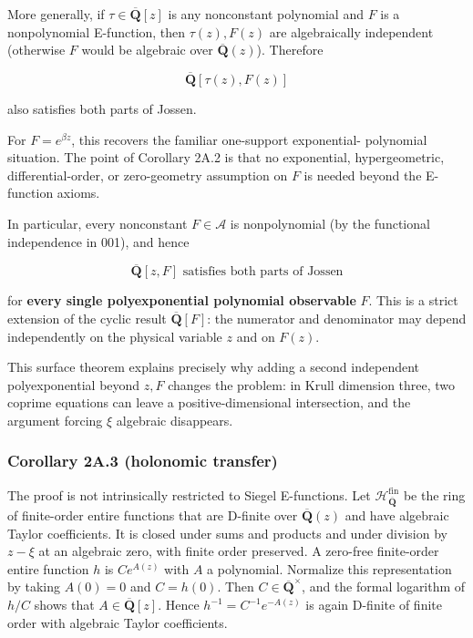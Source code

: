 More generally, if \(\tau\in\overline{\mathbf Q}[z]\) is any nonconstant
polynomial and \(F\) is a nonpolynomial E-function, then \(\tau(z),F(z)\)
are algebraically independent (otherwise \(F\) would be algebraic over
\(\overline{\mathbf Q}(z)\)). Therefore

\[
  \overline{\mathbf Q}[\tau(z),F(z)]
\]

also satisfies both parts of Jossen.

For \(F=e^{\beta z}\), this recovers the familiar one-support exponential-
polynomial situation. The point of Corollary 2A.2 is that no exponential,
hypergeometric, differential-order, or zero-geometry assumption on \(F\) is
needed beyond the E-function axioms.

In particular, every nonconstant \(F\in\mathscr A\) is nonpolynomial (by the
functional independence in 001), and hence

\[
  \boxed{\overline{\mathbf Q}[z,F]\text{ satisfies both parts of Jossen}}
                                                                  \tag{J-2A.4}
\]

for \textbf{every single polyexponential polynomial observable} \(F\). This is a
strict extension of the cyclic result
\(\overline{\mathbf Q}[F]\): the numerator and denominator may depend
independently on the physical variable \(z\) and on \(F(z)\).

This surface theorem explains precisely why adding a second independent
polyexponential beyond \(z,F\) changes the problem: in Krull dimension three,
two coprime equations can leave a positive-dimensional intersection, and the
argument forcing \(\xi\) algebraic disappears.

\subsubsection{Corollary 2A.3 (holonomic transfer)}

The proof is not intrinsically restricted to Siegel E-functions. Let
\(\mathcal H_{\overline{\mathbf Q}}^{\mathrm{fin}}\) be the ring of
finite-order entire functions that are D-finite over
\(\overline{\mathbf Q}(z)\) and have algebraic Taylor coefficients. It is
closed under sums and products and under division by \(z-\xi\) at an
algebraic zero, with finite order preserved. A zero-free finite-order entire
function \(h\) is \(Ce^{A(z)}\) with \(A\) a polynomial. Normalize this
representation by taking \(A(0)=0\) and \(C=h(0)\). Then
\(C\in\overline{\mathbf Q}^{\times}\), and the formal logarithm of \(h/C\)
shows that \(A\in\overline{\mathbf Q}[z]\). Hence \(h^{-1}=C^{-1}e^{-A(z)}\)
is again D-finite of finite order with algebraic Taylor coefficients.

